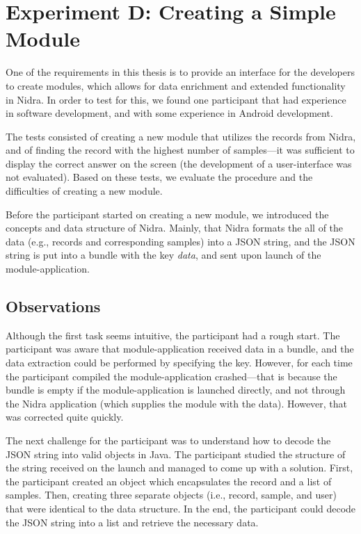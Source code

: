 \section{Experiment D: Creating a Simple Module}
One of the requirements in this thesis is to provide an interface for the developers to create modules, which allows for data enrichment and extended functionality in Nidra. In order to test for this, we found one participant that had experience in software development, and with some experience in Android development.

 The tests consisted of creating a new module that utilizes the records from Nidra, and of finding the record with the highest number of samples---it was sufficient to display the correct answer on the screen (the development of a user-interface was not evaluated). Based on these tests, we evaluate the procedure and the difficulties of creating a new module. 

Before the participant started on creating a new module, we introduced the concepts and data structure of Nidra. Mainly, that Nidra formats the all of the data (e.g., records and corresponding samples) into a JSON string, and the JSON string is put into a bundle with the key \textit{data}, and sent upon launch of the module-application. 


\subsection{Observations}
Although the first task seems intuitive, the participant had a rough start. The participant was aware that module-application received data in a bundle, and the data extraction could be performed by specifying the key. However, for each time the participant compiled the module-application crashed---that is because the bundle is empty if the module-application is launched directly, and not through the Nidra application (which supplies the module with the data). However, that was corrected quite quickly. 

The next challenge for the participant was to understand how to decode the JSON string into valid objects in Java. The participant studied the structure of the string received on the launch and managed to come up with a solution. First, the participant created an object which encapsulates the record and a list of samples. Then, creating three separate objects (i.e., record, sample, and user) that were identical to the data structure. In the end, the participant could decode the JSON string into a list and retrieve the necessary data.

